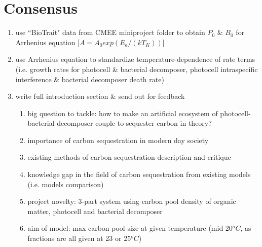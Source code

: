 \documentclass[a4paper,11pt]{article}
\begin{document}
    \section{Consensus}
    \begin{enumerate}
        \item use ``BioTrait" data from CMEE miniproject folder to obtain $P_0$ \& $B_0$ for Arrhenius equation [$A=A_0exp(E_a/(kT_K))$]
        \item use Arrhenius equation to standardize temperature-dependence of rate terms (i.e. growth rates for photocell \& bacterial decomposer, photocell intraspecific interference \& bacterial decomposer death rate)
        \item write full introduction section \& send out for feedback
        \begin{enumerate}
            \item big question to tackle: how to make an artificial ecosystem of photocell-bacterial decomposer couple to sequester carbon in theory?
            \item importance of carbon sequestration in modern day society
            \item existing methods of carbon sequestration description and critique
            \item knowledge gap in the field of carbon sequestration from existing models (i.e. models comparison)
            \item project novelty: 3-part system using carbon pool density of organic matter, photocell and bacterial decomposer
            \item aim of model: max carbon pool size at given temperature (mid-20$^oC$, as fractions are all given at 23 or 25$^oC$)
        \end{enumerate}
    \end{enumerate}
\end{document}
